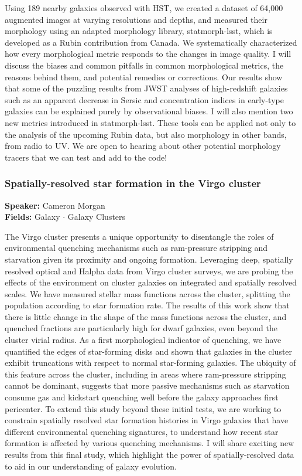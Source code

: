 Using 189 nearby galaxies observed with HST, we created a dataset of 64,000 augmented images at varying resolutions and depths, and measured their morphology using an adapted morphology library, statmorph-lsst, which is developed as a Rubin contribution from Canada. We systematically characterized how every morphological metric responds to the changes in image quality. I will discuss the biases and common pitfalls in common morphological metrics, the reasons behind them, and potential remedies or corrections. Our results show that some of the puzzling results from JWST analyses of high-redshift galaxies such as an apparent decrease in Sersic and concentration indices in early-type galaxies can be explained purely by observational biases. I will also mention two new metrics introduced in statmorph-lsst. These tools can be applied not only to the analysis of the upcoming Rubin data, but also morphology in other bands, from radio to UV. We are open to hearing about other potential morphology tracers that we can test and add to the code!

\hypertarget{abstract-talk-321}{}\label{abstract-page-talk-321}
\subsubsection*{Spatially-resolved star formation in the Virgo cluster}
\textbf{Speaker:} Cameron Morgan\\
\textbf{Fields:} Galaxy $\cdot$ Galaxy Clusters

The Virgo cluster presents a unique opportunity to disentangle the roles of environmental quenching mechanisms such as ram-pressure stripping and starvation given its proximity and ongoing formation. Leveraging deep, spatially resolved optical and Halpha data from Virgo cluster surveys, we are probing the effects of the environment on cluster galaxies on integrated and spatially resolved scales. We have measured stellar mass functions across the cluster, splitting the population according to star formation rate. The results of this work show that there is little change in the shape of the mass functions across the cluster, and quenched fractions are particularly high for dwarf galaxies, even beyond the cluster virial radius. As a first morphological indicator of quenching, we have quantified the edges of star-forming disks and shown that galaxies in the cluster exhibit truncations with respect to normal star-forming galaxies. The ubiquity of this feature across the cluster, including in areas where ram-pressure stripping cannot be dominant, suggests that more passive mechanisms such as starvation consume gas and kickstart quenching well before the galaxy approaches first pericenter. To extend this study beyond these initial tests, we are working to constrain spatially resolved star formation histories in Virgo galaxies that have different environmental quenching signatures, to understand how recent star formation is affected by various quenching mechanisms. I will share exciting new results from this final study, which highlight the power of spatially-resolved data to aid in our understanding of galaxy evolution.

